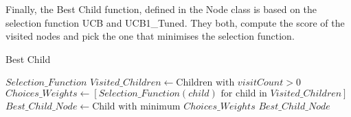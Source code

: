Finally, the Best Child function, defined in the Node class is based on the selection function UCB and UCB1\_Tuned. They both, compute the score of the visited nodes and pick the one that minimises the selection function.

\begin{algorithm}[H]
    \caption{Best Child}
    \label{alg:Best Child}
    \begin{algorithmic}[1]
        \REQUIRE $Selection\_Function$
        \STATE $Visited\_Children \leftarrow \text{Children with } visitCount > 0$
        \STATE $Choices\_Weights \leftarrow \left[ Selection\_Function(child) \text{ for child in } Visited\_Children \right]$
        \STATE $Best\_Child\_Node \leftarrow \text{Child with minimum } Choices\_Weights$
        \RETURN $Best\_Child\_Node$
    \end{algorithmic}
\end{algorithm}
